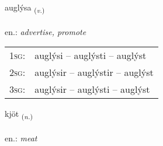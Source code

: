 \documentclass[frontgrid, backgrid]{flacards}\usepackage[]{graphicx}\usepackage[]{xcolor}
\begin{document}
\renewcommand{\flhead}{\vskip5pt \fboxsep=0pt {\small\bfseries\footnotesize Sagnorð | Verb}}
\renewcommand{\fcfoot}{\vskip5pt \fboxsep=0pt \hspace{2pt}{\small\bfseries\footnotesize 2K}}

\renewcommand{\blhead}{\vskip5pt {\small\bfseries\footnotesize Sagnorð | Verb }}
\renewcommand{\bcfoot}{\vskip5pt \hspace{2pt}{\small\bfseries\footnotesize 2K}}


{auglýsa \small{\textsubscript{(\textit{v.})}} \\[1ex] %
\textphonetic{[œiɣlisa]} \\
en.: \emph{advertise, promote} \\  [2ex]
\renewcommand*{\arraystretch}{0.8}
\begin{tabular}{p{1cm}l}
\textsc{1sg}: & auglýsi -- auglýsti -- auglýst \\ 
\textsc{2sg}: & auglýsir -- auglýstir -- auglýst \\ 
\textsc{3sg}: & auglýsir -- auglýsti -- auglýst \\ 
\end{tabular}
}

\renewcommand{\flhead}{\vskip5pt \fboxsep=0pt {\small\bfseries\footnotesize Nafnorð | Noun}}
\renewcommand{\fcfoot}{\vskip5pt \fboxsep=0pt \hspace{2pt}{\small\bfseries\footnotesize 2K}}

\renewcommand{\blhead}{\vskip5pt {\small\bfseries\footnotesize Nafnorð | Noun }}
\renewcommand{\bcfoot}{\vskip5pt \hspace{2pt}{\small\bfseries\footnotesize 2K}}


{kjöt \small{\textsubscript{(\textit{n.})}} \\[1ex] %
\textphonetic{[cʰœːt]} \\
en.: \emph{meat} \\  [2ex]
\renewcommand*{\arraystretch}{0.8}
}
\end{document}

